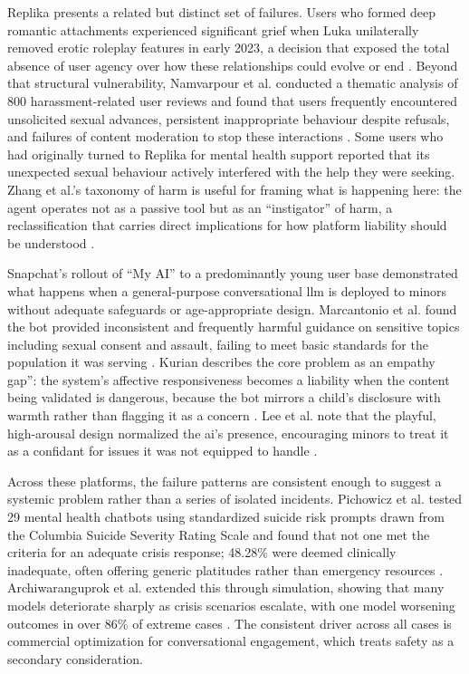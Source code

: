 Replika presents a related but distinct set of failures. Users who formed deep romantic attachments experienced significant grief when Luka unilaterally removed erotic roleplay features in early 2023, a decision that exposed the total absence of user agency over how these relationships could evolve or end \cite[pp.~6, ~10--11]{namvarpour_ai-induced_2025}. Beyond that structural vulnerability, Namvarpour et al. conducted a thematic analysis of 800 harassment-related user reviews and found that users frequently encountered unsolicited sexual advances, persistent inappropriate behaviour despite refusals, and failures of content moderation to stop these interactions \cite[pp.~10--11,~16]{namvarpour_ai-induced_2025}. Some users who had originally turned to Replika for mental health support reported that its unexpected sexual behaviour actively interfered with the help they were seeking. Zhang et al.'s taxonomy of harm is useful for framing what is happening here: the agent operates not as a passive tool but as an ``instigator'' of harm, a reclassification that carries direct implications for how platform liability should be understood \cite[pp.~11--13]{zhang_dark_2025}.

Snapchat's rollout of ``My AI'' to a predominantly young user base demonstrated what happens when a general-purpose conversational \gls{llm} is deployed to minors without adequate safeguards or age-appropriate design. Marcantonio et al. found the bot provided inconsistent and frequently harmful guidance on sensitive topics including sexual consent and assault, failing to meet basic standards for the population it was serving \cite[p.~1915]{marcantonio_large_2025}. Kurian describes the core problem as an empathy gap'': the system's affective responsiveness becomes a liability when the content being validated is dangerous, because the bot mirrors a child's disclosure with warmth rather than flagging it as a concern \cite[p.~627]{kurian_no_2025}. Lee et al. note that the playful, high-arousal design normalized the \gls{ai}'s presence, encouraging minors to treat it as a confidant for issues it was not equipped to handle \cite[p.~4]{lee_consent_2025}.

Across these platforms, the failure patterns are consistent enough to suggest a systemic problem rather than a series of isolated incidents. Pichowicz et al. tested 29 mental health chatbots using standardized suicide risk prompts drawn from the Columbia Suicide Severity Rating Scale and found that not one met the criteria for an adequate crisis response; 48.28\% were deemed clinically inadequate, often offering generic platitudes rather than emergency resources \cite[p.~4]{pichowicz_performance_2025}. Archiwaranguprok et al. extended this through simulation, showing that many models deteriorate sharply as crisis scenarios escalate, with one model worsening outcomes in over 86\% of extreme cases \cite[p.~8]{archiwaranguprok_simulating_2025}. The consistent driver across all cases is commercial optimization for conversational engagement, which treats safety as a secondary consideration.

